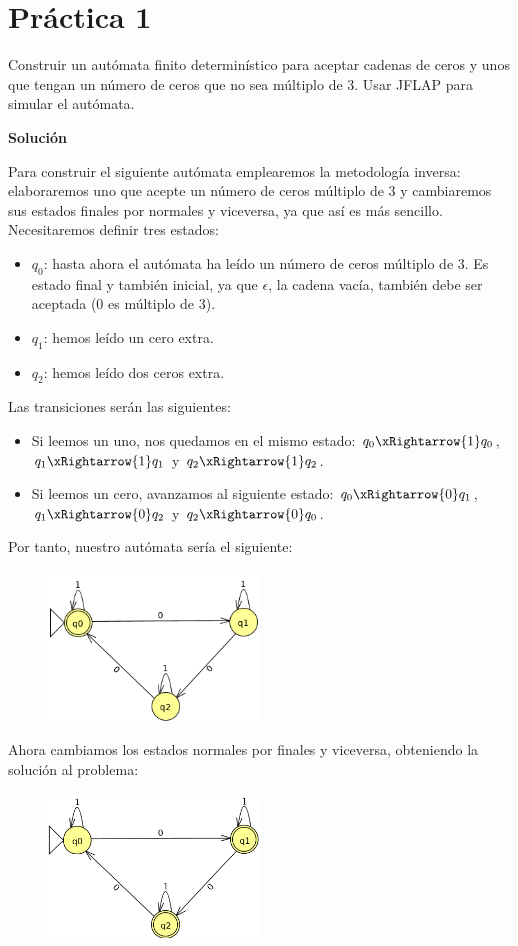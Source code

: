 \documentclass[12pt,spanish]{article}
\newenvironment{solution}{
	\par
	\textbf{Solución}
	\par

}
{
}
\begin{document}
\section{Práctica 1}

Construir un autómata finito determinístico para aceptar cadenas de ceros y unos que tengan un número de ceros que no sea múltiplo de 3. Usar JFLAP para simular el autómata.

\begin{solution}
	Para construir el siguiente autómata emplearemos la metodología inversa: elaboraremos uno que acepte un número de ceros múltiplo de 3 y cambiaremos sus estados finales por normales y viceversa, ya que así es más sencillo.\\
	Necesitaremos definir tres estados:
	\begin{itemize}
		\item $q_0$: hasta ahora el autómata ha leído un número de ceros múltiplo de 3. Es estado final y también inicial, ya que $\epsilon$, la cadena vacía, también debe ser aceptada (0 es múltiplo de 3).
		\item $q_1$: hemos leído un cero extra.
		\item $q_2$: hemos leído dos ceros extra.
	\end{itemize}
	Las transiciones serán las siguientes:
	\begin{itemize}
		\item Si leemos un uno, nos quedamos en el mismo estado: $q_0 \xRightarrow{1} q_0$, $q_1 \xRightarrow{1} q_1$ y $q_2 \xRightarrow{1} q_2$.
		\item Si leemos un cero, avanzamos al siguiente estado: $q_0 \xRightarrow{0} q_1$, $q_1 \xRightarrow{0} q_2$ y $q_2 \xRightarrow{0} q_0$.
	\end{itemize}
	Por tanto, nuestro autómata sería el siguiente:
	\begin{figure}[H]
		\centering
		\includegraphics[width=0.5\textwidth]{p1-1.png}
	\end{figure}
	Ahora cambiamos los estados normales por finales y viceversa, obteniendo la solución al problema:
	\begin{figure}[H]
		\centering
		\includegraphics[width=0.5\textwidth]{p1-2.png}
	\end{figure}
\end{solution}
\newpage
\end{document}
